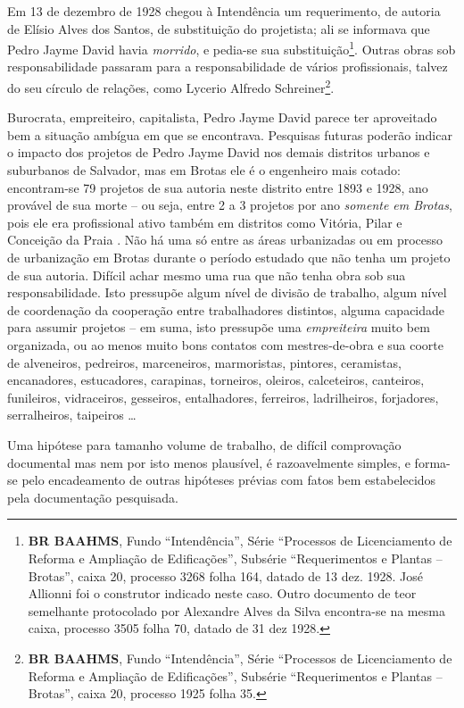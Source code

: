 Em 13 de dezembro de 1928 chegou à Intendência um requerimento, de autoria de Elísio Alves dos Santos, de substituição do projetista; ali se informava que Pedro Jayme David havia \textit{morrido}, e pedia-se sua substituição\footnote{\textbf{BR BAAHMS}, Fundo ``Intendência'', Série ``Processos de Licenciamento de Reforma e Ampliação de Edificações'', Subsérie ``Requerimentos e Plantas – Brotas'', caixa 20, processo 3268 folha 164, datado de 13 dez. 1928. José Allionni foi o construtor indicado neste caso. Outro documento de teor semelhante protocolado por Alexandre Alves da Silva encontra-se na mesma caixa, processo 3505 folha 70, datado de 31 dez 1928.}. Outras obras sob responsabilidade passaram para a responsabilidade de vários profissionais, talvez do seu círculo de relações, como Lycerio Alfredo Schreiner\footnote{\textbf{BR BAAHMS}, Fundo ``Intendência'', Série ``Processos de Licenciamento de Reforma e Ampliação de Edificações'', Subsérie ``Requerimentos e Plantas – Brotas'', caixa 20, processo 1925 folha 35.}.

Burocrata, empreiteiro, capitalista, Pedro Jayme David parece ter aproveitado bem a situação ambígua em que se encontrava. Pesquisas futuras poderão indicar o impacto dos projetos de Pedro Jayme David nos demais distritos urbanos e suburbanos de Salvador, mas em Brotas ele é o engenheiro mais cotado: encontram-se 79 projetos de sua autoria neste distrito entre 1893 e 1928, ano provável de sua morte -- ou seja, entre 2 a 3 projetos por ano \textit{somente em Brotas}, pois ele era profissional ativo também em distritos como Vitória, Pilar e Conceição da Praia \cite{almeida_victoria_1997, almeida_vitrinescomercio_2014}. Não há uma só entre as áreas urbanizadas ou em processo de urbanização em Brotas durante o período estudado que não tenha um projeto de sua autoria. Difícil achar mesmo uma rua que não tenha obra sob sua responsabilidade. Isto pressupõe algum nível de divisão de trabalho, algum nível de coordenação da cooperação entre trabalhadores distintos, alguma capacidade para assumir projetos -- em suma, isto pressupõe uma \textit{empreiteira} muito bem organizada, ou ao menos muito bons contatos com mestres-de-obra e sua coorte de alveneiros, pedreiros, marceneiros, marmoristas, pintores, ceramistas, encanadores, estucadores, carapinas, torneiros, oleiros, calceteiros, canteiros, funileiros, vidraceiros, gesseiros, entalhadores, ferreiros, ladrilheiros,  forjadores, serralheiros, taipeiros \dots

Uma hipótese para tamanho volume de trabalho, de difícil comprovação documental mas nem por isto menos plausível, é razoavelmente simples, e forma-se pelo encadeamento de outras hipóteses prévias com fatos bem estabelecidos pela documentação pesquisada. 

